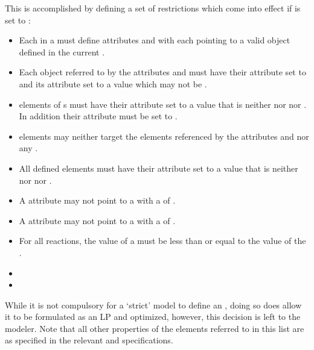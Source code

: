This is accomplished by defining a set of restrictions which come into effect if  is set to :
%
\begin{itemize}
	\item { Each \Reaction in a \Model must define attributes  and  with each pointing to a valid \Parameter object defined in the current \Model.}
	\item {Each \Parameter object referred to by the \Reaction attributes  and  must have their  attribute set to  and its  attribute set to a  value which may not be .
	}
	\item { \SpeciesReference elements of {\Reaction}s must have their  attribute set to a  value that is neither  nor  nor . In addition their  attribute must be set to .
	}
	\item { \InitialAssignment elements may neither target the {\Parameter} elements referenced by the \Reaction attributes  and
	         nor any \SpeciesReference.
	}
	\item { All defined \FluxObjective elements must have their  attribute set to a  value that is neither  nor  nor .
	}
	\item { A \Reaction {} attribute may not point to a \Parameter with a  of .}
	\item { A \Reaction {} attribute may not point to a \Parameter with a  of .}
    \item {For all reactions, the value of a  must be less than or equal to the value of the .}
    \item {}
    \item {}

\end{itemize}
%
While it is not compulsory for a `strict' \FBC model to define an \Objective, doing so does allow it to be formulated as an LP and optimized, however, this decision is left to the modeler. Note that all other properties of the elements referred to in this list are as specified in the relevant \sbmlthreecore and \FBC specifications.

